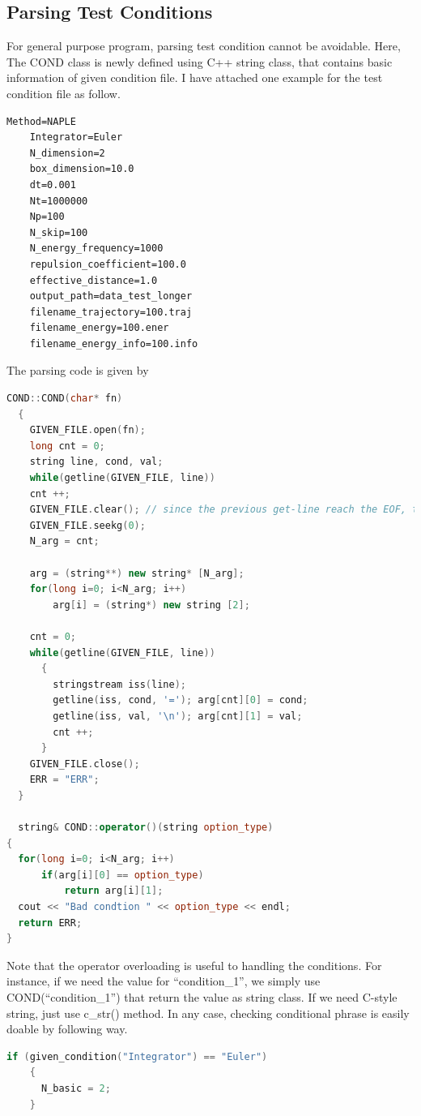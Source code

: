 \documentclass[10pt, a4paper]{report}
\begin{document}
\begin{appendices}
  \section{Parsing Test Conditions}
  For general purpose program, parsing test condition cannot be avoidable. Here, The COND class is newly defined using C++ string class, that contains basic information of given condition file. I have attached one example for the test condition file as follow.
  \begin{lstlisting}[frame=single]
    Method=NAPLE
    Integrator=Euler
    N_dimension=2
    box_dimension=10.0
    dt=0.001
    Nt=1000000
    Np=100
    N_skip=100
    N_energy_frequency=1000
    repulsion_coefficient=100.0
    effective_distance=1.0
    output_path=data_test_longer
    filename_trajectory=100.traj
    filename_energy=100.ener
    filename_energy_info=100.info
  \end{lstlisting}

  The parsing code is given by
  \begin{lstlisting}[language=C++, frame=single]
COND::COND(char* fn)
  {
    GIVEN_FILE.open(fn);
    long cnt = 0;
    string line, cond, val;
    while(getline(GIVEN_FILE, line))
    cnt ++;
    GIVEN_FILE.clear(); // since the previous get-line reach the EOF, this is bad-status. So, it need clear to use file object.
    GIVEN_FILE.seekg(0);
    N_arg = cnt; 

    arg = (string**) new string* [N_arg];
    for(long i=0; i<N_arg; i++)
        arg[i] = (string*) new string [2];

    cnt = 0;
    while(getline(GIVEN_FILE, line))
      {
        stringstream iss(line);
        getline(iss, cond, '='); arg[cnt][0] = cond;
        getline(iss, val, '\n'); arg[cnt][1] = val;
        cnt ++;
      }
    GIVEN_FILE.close();
    ERR = "ERR";
  }

  string& COND::operator()(string option_type)
{
  for(long i=0; i<N_arg; i++)
      if(arg[i][0] == option_type)
          return arg[i][1];
  cout << "Bad condtion " << option_type << endl;
  return ERR;
}
  \end{lstlisting}

  Note that the operator overloading is useful to handling the conditions. For instance, if we need the value for ``condition{\_}1'', we simply use COND(``condition{\_}1'') that return the value as string class. If we need C-style string, just use c{\_}str() method. In any case, checking conditional phrase is easily doable by following way.
  \begin{lstlisting}[language=C++, frame=single]
    if (given_condition("Integrator") == "Euler")
    {
      N_basic = 2;
    }
  \end{lstlisting}
  

\end{appendices}
\end{document}
